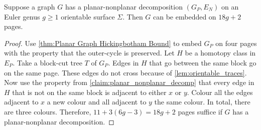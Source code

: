 \begin{lemma}\label{lem:planar_nonplanar_orientable}
	Suppose a graph \(G\) has a planar-nonplanar decomposition \((G_P, E_N)\) on an Euler genus $g \geq 1$ orientable surface \(\Sigma\). Then \(G\) can be embedded on \(18g + 2\) pages.
\end{lemma}
\begin{proof}
	Use \cref{thm:Planar Graph Hickingbotham Bound} to embed $G_P$ on four pages with the property that the outer-cycle is preserved. Let $H$ be a homotopy class in $E_P$.
	Take a block-cut tree $T$ of $G_P$. Edges in $H$ that go between the same block go on the same page. These edges do not cross because of \cref{lem:orientable_traces}. Now use the property from \cref{claim:planar_nonplanar_decomp} that every edge in $H$ that is not on the same block is adjacent to either $x$ or $y$. Colour all the edges adjacent to $x$ a new colour and all adjacent to $y$ the same colour. In total, there are three colours. 
	Therefore, \(11 + 3(6g - 3) = 18g + 2\) pages suffice if \(G\) has a planar-nonplanar decomposition.
\end{proof}